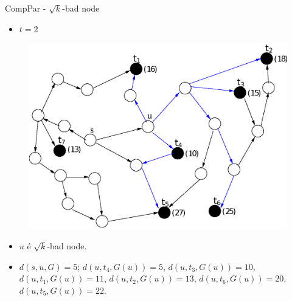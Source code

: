 \documentclass[10pt]{beamer}
\begin{document}
\begin{frame}{CompPar - $\sqrt{k}$-bad node}
\begin{itemize}
  \item $t = 2$
\end{itemize}
\begin{figure}[H]
\centering
\includegraphics[scale=0.45]{imagens/compPar_bad1}
\label{fig:fig}
\end{figure}
\footnotesize
\begin{itemize}
  \item $u$ é $\sqrt{k}$-bad node.
  \item $d(s,u,G) = 5$; $d(u,t_4,G(u)) = 5$, $d(u,t_3,G(u)) = 10$, $d(u,t_1,G(u)) = 11$, $d(u,t_2,G(u)) = 13$, $d(u,t_6,G(u)) = 20$, $d(u,t_5,G(u)) = 22$.
\end{itemize}
\end{frame}
\end{document}
